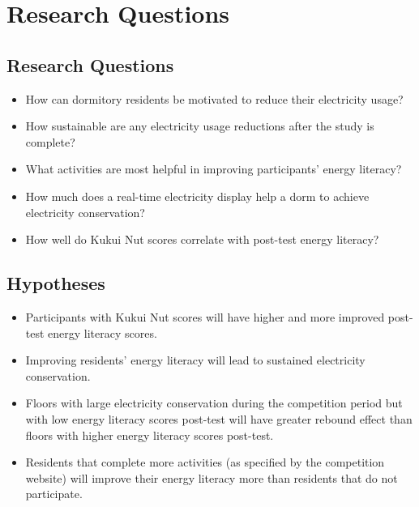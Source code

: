 \chapter{Research Questions}

\section{Research Questions}

\begin{itemize}

\item How can dormitory residents be motivated to reduce their electricity usage?

\item How sustainable are any electricity usage reductions after the study is complete?

\item What activities are most helpful in improving participants' energy literacy?

\item How much does a real-time electricity display help a dorm to achieve electricity conservation?

\item How well do Kukui Nut scores correlate with post-test energy literacy?

\end{itemize}


\section{Hypotheses}

\begin{itemize}

\item Participants with Kukui Nut scores will have higher and more improved post-test energy literacy scores.

\item Improving residents' energy literacy will lead to sustained electricity conservation.

\item Floors with large electricity conservation during the competition period but with low energy literacy scores post-test will have greater rebound effect than floors with higher energy literacy scores post-test.

\item Residents that complete more activities (as specified by the competition website) will improve their energy literacy more than residents that do not participate.

\end{itemize}